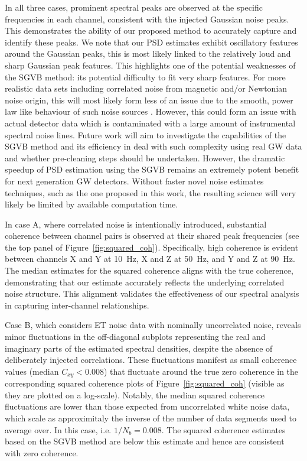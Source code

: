 \documentclass[%
 reprint,
 amsmath,amssymb,
 aps,
 nofootinbib,
]{revtex4-2}
\begin{document}
In all three cases, prominent spectral peaks are observed at the specific frequencies in each channel, consistent with the injected Gaussian noise peaks.  
This demonstrates the ability of our proposed method to accurately capture and identify these peaks.
We note that our PSD estimates exhibit oscillatory features around the Gaussian peaks, this is most likely linked to the relatively loud and sharp Gaussian peak features. This highlights one of the potential weaknesses of the SGVB method: its potential difficulty to  fit very sharp features. For more realistic data sets including correlated noise from magnetic and/or Newtonian noise origin, this will most likely form less of an issue due to the smooth, power law like behaviour of such noise sources \citet{Janssens_magnetic_noise,Janssens_newtonian_seismic,PhysRevD.109.102002,Janssens2023}. However, this could form an issue with actual detector data which is contaminated with a large amount of instrumental spectral noise lines. Future work will aim to investigate the capabilities of the SGVB method and its efficiency in deal with such complexity using real GW data and whether pre-cleaning steps should be undertaken. However, the dramatic speedup of PSD estimation using the SGVB remains an extremely potent benefit for next generation GW detectors. Without faster novel noise estimates techniques, such as the one proposed in this work, the resulting science will very likely be limited by available computation time.

In case A, where correlated noise is intentionally introduced, substantial coherence between channel pairs is observed at their shared peak frequencies (see the top panel of Figure~\ref{fig:squared_coh}). 
Specifically, high coherence is evident between channels X and Y at \SI{10}{Hz}, X and Z at \SI{50}{Hz}, and Y and Z at \SI{90}{Hz}. 
The median estimates for the squared coherence aligns with the true coherence, demonstrating that our estimate accurately reflects the underlying correlated noise structure. This alignment validates the effectiveness of our spectral analysis in capturing inter-channel relationships.


Case B, which considers ET noise data with nominally uncorrelated noise, reveals minor fluctuations in the off-diagonal subplots representing the real and imaginary parts of the estimated spectral densities, despite the absence of deliberately injected correlations. These fluctuations manifest as small coherence values (median $C_{xy} < 0.008$) that fluctuate around the true zero coherence in the corresponding squared coherence plots of Figure~\ref{fig:squared_coh} (visible as they are plotted on a log-scale). Notably, the median squared coherence fluctuations are lower than those expected from uncorrelated white noise data, which scale as approximitaly the inverse of the number of data segments used to average over. In this case, i.e.  $1/N_b = 0.008$. The squared coherence estimates based on the SGVB method are below this estimate and hence are consistent with zero coherence.
\end{document}
